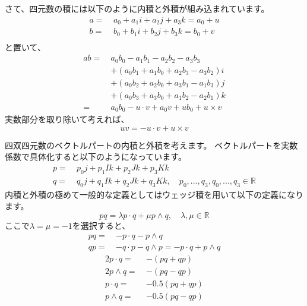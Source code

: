 \documentclass[a4paper,12pt,notitlepage]{jsreport}
\begin{document}
さて、四元数の積には以下のように内積と外積が組み込まれています。
\begin{equation}
\begin{split}
a=~&a_0+a_1i+a_2j+a_3k=a_0+u\\
b=~&b_0+b_1i+b_2j+b_3k=b_0+v\\
\end{split}
\end{equation}
と置いて、
\begin{equation}
\begin{split}
ab=~&a_0b_0-a_1b_1-a_2b_2-a_3b_3\\
&+(a_0b_1+a_1b_0+a_2b_3-a_3b_2)i\\
&+(a_0b_2+a_2b_0+a_3b_1-a_1b_3)j\\
&+(a_0b_3+a_3b_0+a_1b_2-a_2b_1)k\\
=~&a_0b_0-u\cdot v+a_0v+ub_0+u\times v
\end{split}
\end{equation}
実数部分を取り除いて考えれば、
\begin{equation}
uv=-u\cdot v+u\times v
\end{equation}

四双四元数のベクトルパートの内積と外積を考えます。
ベクトルパートを実数係数で具体化すると以下のようになっています。
\begin{equation}
\begin{split}
p=~&p_0j+p_1Ik+p_2Jk+p_3Kk\\
q=~&q_0j+q_1Ik+q_2Jk+q_3Kk,\quad p_0,...,q_3,q_0,...,q_3\in\mathbb{R}
\end{split}
\end{equation}
内積と外積の極めて一般的な定義としてはウェッジ積を用いて以下の定義になります。
\begin{equation}
pq=\lambda p\cdot q+\mu p\wedge q,\quad \lambda,\mu\in\mathbb{R}
\end{equation}
ここで$\lambda=\mu=-1$を選択すると、
\begin{equation}
\begin{split}
pq=~&-p\cdot q-p\wedge q\\
qp=~&-q\cdot p-q\wedge p=-p\cdot q+p\wedge q
\end{split}
\end{equation}
\begin{equation}
\begin{split}
2p\cdot q=~&-(pq+qp)\\
2p\wedge q=~&-(pq-qp)\\
p\cdot q=~&-0.5(pq+qp)\\
p\wedge q=~&-0.5(pq-qp)
\end{split}
\end{equation}
\end{document}
